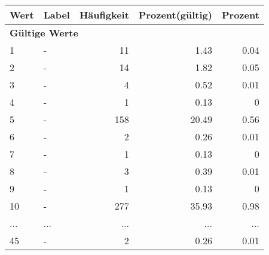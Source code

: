     \begin{longtable}{lXrrr}
     \toprule
     \textbf{Wert} & \textbf{Label} & \textbf{Häufigkeit} & \textbf{Prozent(gültig)} & \textbf{Prozent} \\
     \endhead
     \midrule
     \multicolumn{5}{l}{\textbf{Gültige Werte}}\\
        1 & \multicolumn{1}{X}{-} & %
          \num{11} &
          \num[round-mode=places,round-precision=2]{1.43} &
          \num[round-mode=places,round-precision=2]{0.04} \\
        2 & \multicolumn{1}{X}{-} & %
          \num{14} &
          \num[round-mode=places,round-precision=2]{1.82} &
          \num[round-mode=places,round-precision=2]{0.05} \\
        3 & \multicolumn{1}{X}{-} & %
          \num{4} &
          \num[round-mode=places,round-precision=2]{0.52} &
          \num[round-mode=places,round-precision=2]{0.01} \\
        4 & \multicolumn{1}{X}{-} & %
          \num{1} &
          \num[round-mode=places,round-precision=2]{0.13} &
          \num[round-mode=places,round-precision=2]{0} \\
        5 & \multicolumn{1}{X}{-} & %
          \num{158} &
          \num[round-mode=places,round-precision=2]{20.49} &
          \num[round-mode=places,round-precision=2]{0.56} \\
        6 & \multicolumn{1}{X}{-} & %
          \num{2} &
          \num[round-mode=places,round-precision=2]{0.26} &
          \num[round-mode=places,round-precision=2]{0.01} \\
        7 & \multicolumn{1}{X}{-} & %
          \num{1} &
          \num[round-mode=places,round-precision=2]{0.13} &
          \num[round-mode=places,round-precision=2]{0} \\
        8 & \multicolumn{1}{X}{-} & %
          \num{3} &
          \num[round-mode=places,round-precision=2]{0.39} &
          \num[round-mode=places,round-precision=2]{0.01} \\
        9 & \multicolumn{1}{X}{-} & %
          \num{1} &
          \num[round-mode=places,round-precision=2]{0.13} &
          \num[round-mode=places,round-precision=2]{0} \\
        10 & \multicolumn{1}{X}{-} & %
          \num{277} &
          \num[round-mode=places,round-precision=2]{35.93} &
          \num[round-mode=places,round-precision=2]{0.98} \\
       ... & ... & ... & ... & ... \\
        45 & \multicolumn{1}{X}{-} & %
          \num{2} &
          \num[round-mode=places,round-precision=2]{0.26} &
          \num[round-mode=places,round-precision=2]{0.01} \\


\end{longtable}
